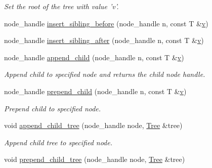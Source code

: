 \begin{DoxyCompactItemize}
\begin{DoxyCompactList}\small\item\em Set the root of the tree with value 'v'. \end{DoxyCompactList}\item 
node\-\_\-handle \hyperlink{class_d_o_1_1_tree_a3b85d61d075fcee2959be9c1b564e23b}{insert\-\_\-sibling\-\_\-before} (node\-\_\-handle n, const T \&\hyperlink{group___channel_accessors_ga1dd2524c5b8d3db33137eedb803fc2ce}{v})
\item 
node\-\_\-handle \hyperlink{class_d_o_1_1_tree_abe4588e8f434f4ab6fa9654427cc4dda}{insert\-\_\-sibling\-\_\-after} (node\-\_\-handle n, const T \&\hyperlink{group___channel_accessors_ga1dd2524c5b8d3db33137eedb803fc2ce}{v})
\item 
\hypertarget{class_d_o_1_1_tree_a120c2a2f64f45604e96c85ca3984aaed}{node\-\_\-handle \hyperlink{class_d_o_1_1_tree_a120c2a2f64f45604e96c85ca3984aaed}{append\-\_\-child} (node\-\_\-handle n, const T \&\hyperlink{group___channel_accessors_ga1dd2524c5b8d3db33137eedb803fc2ce}{v})}\label{class_d_o_1_1_tree_a120c2a2f64f45604e96c85ca3984aaed}

\begin{DoxyCompactList}\small\item\em Append child to specified node and returns the child node handle. \end{DoxyCompactList}\item 
\hypertarget{class_d_o_1_1_tree_aa3b8256209a0a013e04a479b0ed5d0a6}{node\-\_\-handle \hyperlink{class_d_o_1_1_tree_aa3b8256209a0a013e04a479b0ed5d0a6}{prepend\-\_\-child} (node\-\_\-handle n, const T \&\hyperlink{group___channel_accessors_ga1dd2524c5b8d3db33137eedb803fc2ce}{v})}\label{class_d_o_1_1_tree_aa3b8256209a0a013e04a479b0ed5d0a6}

\begin{DoxyCompactList}\small\item\em Prepend child to specified node. \end{DoxyCompactList}\item 
\hypertarget{class_d_o_1_1_tree_a15908e24c5d1f66b6d96b548291ff5c3}{void \hyperlink{class_d_o_1_1_tree_a15908e24c5d1f66b6d96b548291ff5c3}{append\-\_\-child\-\_\-tree} (node\-\_\-handle node, \hyperlink{class_d_o_1_1_tree}{Tree} \&tree)}\label{class_d_o_1_1_tree_a15908e24c5d1f66b6d96b548291ff5c3}

\begin{DoxyCompactList}\small\item\em Append child tree to specified node. \end{DoxyCompactList}\item 
\hypertarget{class_d_o_1_1_tree_a4261f34846d379bad5deee88b905762f}{void \hyperlink{class_d_o_1_1_tree_a4261f34846d379bad5deee88b905762f}{prepend\-\_\-child\-\_\-tree} (node\-\_\-handle node, \hyperlink{class_d_o_1_1_tree}{Tree} \&tree)}\label{class_d_o_1_1_tree_a4261f34846d379bad5deee88b905762f}


\end{DoxyCompactItemize}
